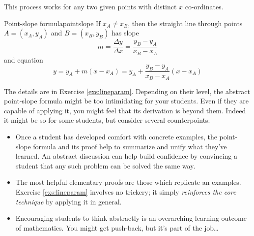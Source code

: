 \pagebreak[3]


This process works for any two given points with distinct $x$ co-ordinates.

\begin{thm}{Point-slope formula}{pointslope}
	If $x_A\neq x_B$, then the straight line through points $A=(x_A,y_A)$ and $B=(x_B,y_B)$ has slope
	\[
		m=\frac{\Delta y}{\Delta x}=\frac{y_B-y_A}{x_B-x_A}
	\]
	and equation
	\[
		y=y_A+m(x-x_A) =y_A+\frac{y_B-y_A}{x_B-x_A}(x-x_A)
	\]
\end{thm}

The details are in Exercise \ref{exs:lineparam}. Depending on their level, the abstract point-slope formula might be too intimidating for your students. Even if they are capable of applying it, you might feel that its derivation is beyond them. Indeed it might be so for some students, but consider several counterpoints:
\begin{itemize}
  \item Once a student has developed comfort with concrete examples, the point-slope formula and its proof help to summarize and unify what they've learned. An abstract discussion can help build confidence by convincing a student that any such problem can be solved the same way.
  \item The most helpful elementary proofs are those which replicate an examples. Exercise \ref{exs:lineparam} involves no trickery; it simply \emph{reinforces the core technique} by applying it in general.
  \item Encouraging students to think abstractly is an overarching learning outcome of mathematics. You might get push-back, but it's part of the job\ldots
\end{itemize}

